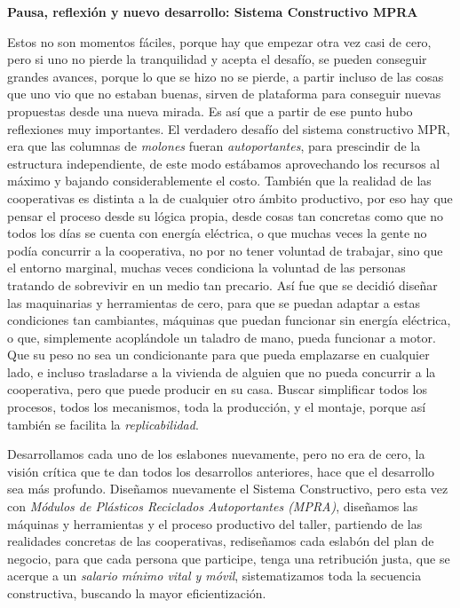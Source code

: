 \begin{fullwidth}
\textbf{Pausa, reflexión y nuevo desarrollo: Sistema Constructivo MPRA}

Estos no son momentos fáciles, porque hay que empezar otra vez casi de
cero, pero si uno no pierde la tranquilidad y acepta el desafío, se
pueden conseguir grandes avances, porque lo que se hizo no se pierde, a
partir incluso de las cosas que uno vio que no estaban buenas, sirven de
plataforma para conseguir nuevas propuestas desde una nueva mirada. Es
así que a partir de ese punto hubo reflexiones muy importantes. El
verdadero desafío del sistema constructivo MPR, era que las columnas de
\emph{molones} fueran \emph{autoportantes}, para prescindir de la
estructura independiente, de este modo estábamos aprovechando los
recursos al máximo y bajando considerablemente el costo. También que la
realidad de las cooperativas es distinta a la de cualquier otro ámbito
productivo, por eso hay que pensar el proceso desde su lógica propia,
desde cosas tan concretas como que no todos los días se cuenta con
energía eléctrica, o que muchas veces la gente no podía concurrir a la
cooperativa, no por no tener voluntad de trabajar, sino que el entorno
marginal, muchas veces condiciona la voluntad de las personas tratando
de sobrevivir en un medio tan precario. Así fue que se decidió diseñar
las maquinarias y herramientas de cero, para que se puedan adaptar a
estas condiciones tan cambiantes, máquinas que puedan funcionar sin
energía eléctrica, o que, simplemente acoplándole un taladro de mano,
pueda funcionar a motor. Que su peso no sea un condicionante para que
pueda emplazarse en cualquier lado, e incluso trasladarse a la vivienda
de alguien que no pueda concurrir a la cooperativa, pero que puede
producir en su casa. Buscar simplificar todos los procesos, todos los
mecanismos, toda la producción, y el montaje, porque así también se
facilita la \emph{replicabilidad}.

Desarrollamos cada uno de los eslabones nuevamente, pero no era de cero,
la visión crítica que te dan todos los desarrollos anteriores, hace que
el desarrollo sea más profundo. Diseñamos nuevamente el Sistema
Constructivo, pero esta vez con \emph{Módulos de Plásticos Reciclados
Autoportantes (MPRA)}, diseñamos las máquinas y herramientas y el
proceso productivo del taller, partiendo de las realidades concretas de
las cooperativas, rediseñamos cada eslabón del plan de negocio, para que
cada persona que participe, tenga una retribución justa, que se acerque
a un \emph{salario mínimo vital y móvil}, sistematizamos toda la
secuencia constructiva, buscando la mayor eficientización.


\end{fullwidth}

